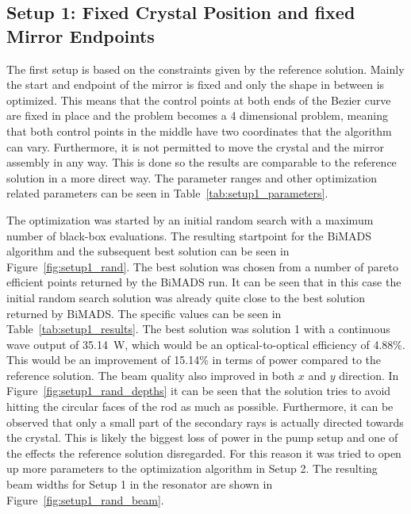 \documentclass[a4paper,10pt]{article}
\newcommand{\figref}[1]{Figure~\ref{#1}}
\newcommand{\tabref}[1]{Table~\ref{#1}}
\begin{document}
    \subsection{Setup 1: Fixed Crystal Position and fixed Mirror Endpoints}
    
    The first setup is based on the constraints given by the reference
    solution.
    Mainly the start and endpoint of the mirror is fixed and only the shape
    in between is optimized.
    This means that the control points at both ends of the Bezier curve
    are fixed in place and the problem becomes a 4 dimensional problem,
    meaning that both control points in the middle have two coordinates
    that the algorithm can vary.
    Furthermore, it is not permitted to move the crystal and the mirror
    assembly in any way.
    This is done so the results are comparable to the reference solution
    in a more direct way.
    The parameter ranges and other optimization related parameters can be
    seen in \tabref{tab:setup1_parameters}.
    
    The optimization was started by an initial random search with a 
    maximum number of black-box evaluations.
    The resulting startpoint for the BiMADS algorithm and the
    subsequent best solution can be seen in \figref{fig:setup1_rand}.
    The best solution was chosen from a number of pareto efficient
    points returned by the BiMADS run.
    It can be seen that in this case the initial random search solution
    was already quite close to the best solution returned by BiMADS.
    The specific values can be seen in \tabref{tab:setup1_results}.
    The best solution was solution 1 with a continuous wave output
    of \SI{35.14}{W}, which would be an optical-to-optical 
    efficiency of 4.88\%.
    This would be an improvement of 15.14\% in terms of power compared
    to the reference solution.
    The beam quality also improved in both $x$ and $y$ direction.
    In \figref{fig:setup1_rand_depths} it can be seen that the solution
    tries to avoid hitting the circular faces of the rod as much as
    possible.
    Furthermore, it can be observed that only a small part of the secondary
    rays is actually directed towards the crystal.
    This is likely the biggest loss of power in the pump setup and one of
    the effects the reference solution disregarded.
    For this reason it was tried to open up more parameters to the
    optimization algorithm in Setup 2.
    The resulting beam widths for Setup 1 in the resonator are shown in
    \figref{fig:setup1_rand_beam}. 
\end{document}
